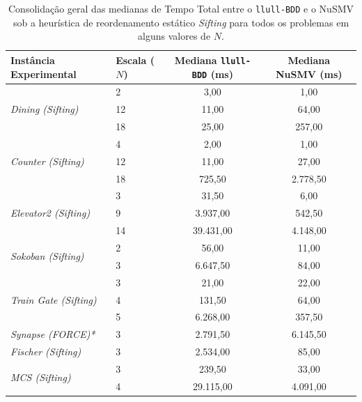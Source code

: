 \documentclass[cic,tc]{infufrgs}
\begin{document}
	\begin{table}[htbp]
		\centering
		\caption{Consolidação geral das medianas de Tempo Total entre o \texttt{llull-BDD} e o NuSMV sob a heurística de reordenamento estático \textit{Sifting} para todos os problemas em alguns valores de $N$.}
		\label{tab:consolidacao_mestra_sifting}
		\small
		\begin{tabular}{llcc}
			\toprule
			\textbf{Instância Experimental} & \textbf{Escala ($N$)} & \textbf{Mediana \texttt{llull-BDD} (ms)} & \textbf{Mediana NuSMV (ms)} \\
			\midrule
			\multirow{3}{*}{\textit{Dining (Sifting)}} 
			& 2  & 3,00   & 1,00 \\
			& 12 & 11,00  & 64,00 \\
			& 18 & 25,00  & 257,00 \\
			\midrule
			\multirow{3}{*}{\textit{Counter (Sifting)}} 
			& 4  & 2,00   & 1,00 \\
			& 12 & 11,00  & 27,00 \\
			& 18 & 725,50 & 2.778,50 \\
			\midrule
			\multirow{3}{*}{\textit{Elevator2 (Sifting)}} 
			& 3  & 31,50  & 6,00 \\
			& 9  & 3.937,00 & 542,50 \\
			& 14 & 39.431,00 & 4.148,00 \\
			\midrule
			\multirow{2}{*}{\textit{Sokoban (Sifting)}} 
			& 2  & 56,00  & 11,00 \\
			& 3  & 6.647,50 & 84,00 \\
			\midrule
			\multirow{3}{*}{\textit{Train Gate (Sifting)}} 
			& 3  & 21,00  & 22,00 \\
			& 4  & 131,50 & 64,00 \\
			& 5  & 6.268,00 & 357,50 \\
			\midrule
			\multirow{1}{*}{\textit{Synapse (FORCE)*}} 
			& 3  & 2.791,50 & 6.145,50 \\
			\midrule
			\multirow{1}{*}{\textit{Fischer (Sifting)}} 
			& 3  & 2.534,00 & 85,00 \\
			\midrule
			\multirow{2}{*}{\textit{MCS (Sifting)}} 
			& 3  & 239,50 & 33,00 \\
			& 4  & 29.115,00 & 4.091,00 \\
			\bottomrule
		\end{tabular}
	\end{table}
	
\end{document}
